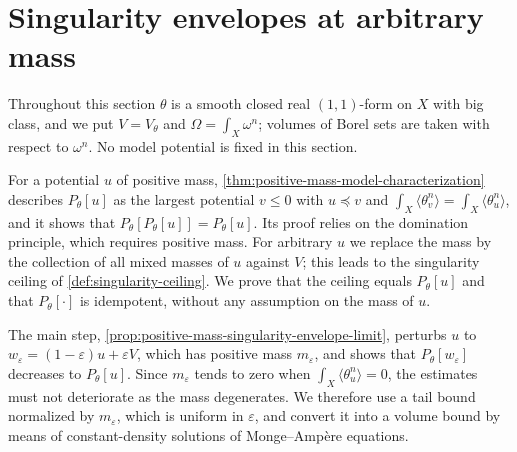 \section{Singularity envelopes at arbitrary mass}
\label{sec:arbitrary-mass-singularity-envelopes}
Throughout this section $\theta$ is a smooth closed real $(1,1)$-form on $X$ with big class, and we put $V=V_\theta$ and $\Omega=\int_X\omega^n$; volumes of Borel sets are taken with respect to $\omega^n$. No model potential is fixed in this section.

For a potential $u$ of positive mass, \cref{thm:positive-mass-model-characterization} describes $P_\theta[u]$ as the largest potential $v\leq0$ with $u\preceq v$ and $\int_X\langle\theta_v^n\rangle=\int_X\langle\theta_u^n\rangle$, and it shows that $P_\theta[P_\theta[u]]=P_\theta[u]$. Its proof relies on the domination principle, which requires positive mass. For arbitrary $u$ we replace the mass by the collection of all mixed masses of $u$ against $V$; this leads to the singularity ceiling of \cref{def:singularity-ceiling}. We prove that the ceiling equals $P_\theta[u]$ and that $P_\theta[\cdot]$ is idempotent, without any assumption on the mass of $u$.

The main step, \cref{prop:positive-mass-singularity-envelope-limit}, perturbs $u$ to $w_\varepsilon=(1-\varepsilon)u+\varepsilon V$, which has positive mass $m_\varepsilon$, and shows that $P_\theta[w_\varepsilon]$ decreases to $P_\theta[u]$. Since $m_\varepsilon$ tends to zero when $\int_X\langle\theta_u^n\rangle=0$, the estimates must not deteriorate as the mass degenerates. We therefore use a tail bound normalized by $m_\varepsilon$, which is uniform in $\varepsilon$, and convert it into a volume bound by means of constant-density solutions of Monge--Amp\`ere equations.

